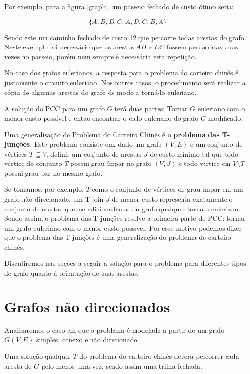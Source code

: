 Por exemplo, para a figura \ref{graph}, um passeio fechado de custo ótimo seria: 

\[ \{A, B, D, C, A, D, C, B, A\} \] 

Sendo este um caminho fechado de custo 12 que percorre todas arestas do grafo.
Neste exemplo foi necessário que as arestas $AB$ e $DC$ fossem percorridas duas vezes no passeio, porém nem sempre é necessária esta repetição.

No caso dos grafos eulerianos, a resposta para o problema do carteiro chinês é justamente o circuito euleriano.
Nos outros casos, o procedimento será realizar a cópia de algumas arestas do grafo de modo a torná-lo euleriano.

A solução do PCC para um grafo $G$ terá duas partes: Tornar $G$ euleriano com o menor custo possível e então encontrar o ciclo euleriano do grafo $G$ modificado.

Uma generalização do Problema do Carteiro Chinês é o \textbf{problema das T-junções}.
Este problema consiste em, dado um grafo $(V, E)$ e um conjunto de vértices $T \subseteq V$, definir um conjunto de arestas $J$ de custo mínimo tal que todo vértice do conjunto $T$ possui grau ímpar no grafo $(V, J)$ e todo vértice em $V \setminus T$ possui grau par no mesmo grafo.

Se tomamos, por exemplo, $T$ como o conjunto de vértices de grau ímpar em um grafo não direcionado, um T-join $J$ de menor custo representa exatamente o conjunto de arestas que, se adicionadas a um grafo qualquer torna-o euleriano.
Sendo assim, o problema das T-junções resolve a primeira parte do PCC: tornar um grafo euleriano com o menor custo possível. 
Por esse motivo podemos dizer que o problema das T-junções é uma generalização do problema do carteiro chinês.

Discutiremos nas seções a seguir a solução para o problema para diferentes tipos de grafo quanto à orientação de suas arestas. 

\section{Grafos não direcionados}
        \label{sec:pcc}

Analisaremos o caso em que o problema é modelado a partir de um grafo $G(V, E)$ simples, conexo e não direcionado.

Uma solução qualquer $T$ do problema do carteiro chinês deverá percorrer cada aresta de $G$ pelo menos uma vez, sendo assim uma trilha fechada.

